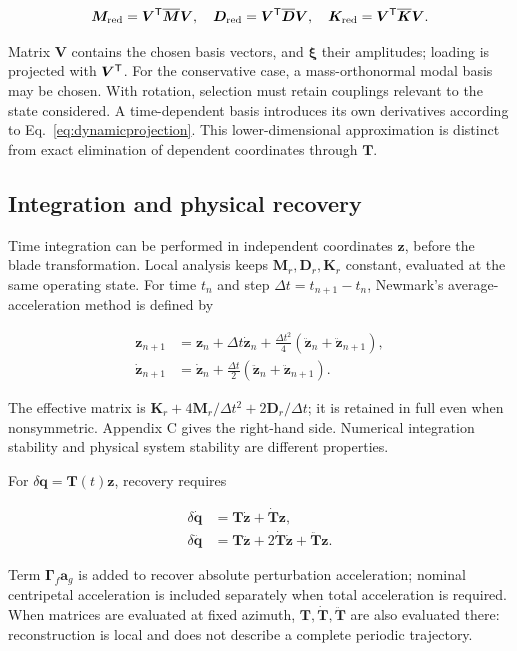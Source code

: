 \begin{equation}
\bm M_{\rm red}=\bm V^\mathsf T\overline{\bm M}\bm V,\quad
\bm D_{\rm red}=\bm V^\mathsf T\overline{\bm D}\bm V,\quad
\bm K_{\rm red}=\bm V^\mathsf T\overline{\bm K}\bm V.
\end{equation}

Matrix $\bm V$ contains the chosen basis vectors, and $\bm\xi$ their amplitudes; loading is projected with $\bm V^\mathsf T$. For the conservative case, a mass-orthonormal modal basis may be chosen. With rotation, selection must retain couplings relevant to the state considered. A time-dependent basis introduces its own derivatives according to Eq.~\eqref{eq:dynamicprojection}. This lower-dimensional approximation is distinct from exact elimination of dependent coordinates through $\bm T$.

\subsection{Integration and physical recovery}
Time integration can be performed in independent coordinates $\bm z$, before the blade transformation. Local analysis keeps $\bm M_r,\bm D_r,\bm K_r$ constant, evaluated at the same operating state. For time $t_n$ and step $\Delta t=t_{n+1}-t_n$, Newmark's average-acceleration method is defined by

\begin{align}
\bm z_{n+1}&=\bm z_n+\Delta t\dot{\bm z}_n
+\tfrac{\Delta t^2}{4}(\ddot{\bm z}_n+\ddot{\bm z}_{n+1}),\nonumber\\
\dot{\bm z}_{n+1}&=\dot{\bm z}_n+\tfrac{\Delta t}{2}
(\ddot{\bm z}_n+\ddot{\bm z}_{n+1}).
\end{align}

The effective matrix is $\bm K_r+4\bm M_r/\Delta t^2+2\bm D_r/\Delta t$; it is retained in full even when nonsymmetric. Appendix C gives the right-hand side. Numerical integration stability and physical system stability are different properties.

For $\delta\bm q=\bm T(t)\bm z$, recovery requires

\begin{align}
\delta\dot{\bm q}&=\bm T\dot{\bm z}+\dot{\bm T}\bm z,\nonumber\\
\delta\ddot{\bm q}&=\bm T\ddot{\bm z}+2\dot{\bm T}\dot{\bm z}+\ddot{\bm T}\bm z.
\end{align}

Term $\bm\Gamma_f\bm a_g$ is added to recover absolute perturbation acceleration; nominal centripetal acceleration is included separately when total acceleration is required. When matrices are evaluated at fixed azimuth, $\bm T,\dot{\bm T},\ddot{\bm T}$ are also evaluated there: reconstruction is local and does not describe a complete periodic trajectory.

